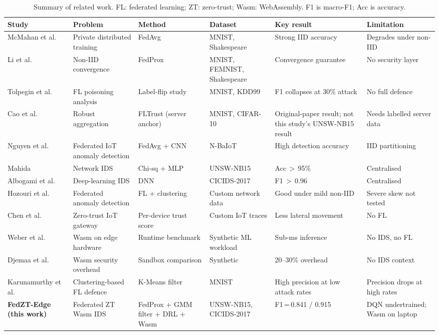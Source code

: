 \documentclass[iicol,Numbered]{sn-jnl}
\begin{document}
\begin{table}[t]
\centering
\footnotesize
\caption{Summary of related work. FL: federated learning; ZT: zero-trust;
Wasm: WebAssembly. F1 is macro-F1; Acc is accuracy.}
\label{tab:related}
\setlength{\tabcolsep}{3pt}
\begin{tabularx}{\textwidth}{@{}P{2.9cm} Y Y Y Y Y@{}}
\toprule
\textbf{Study} & \textbf{Problem} & \textbf{Method} & \textbf{Dataset} &
\textbf{Key result} & \textbf{Limitation} \\
\midrule
McMahan et al.~\cite{mcmahan2017} & Private distributed training & FedAvg & MNIST, Shakespeare & Strong IID accuracy & Degrades under non-IID \\
Li et al.~\cite{li2020federated} & Non-IID convergence & FedProx & MNIST, FEMNIST, Shakespeare & Convergence guarantee & No security layer \\
Tolpegin et al.~\cite{tolpegin2020} & FL poisoning analysis & Label-flip study & MNIST, KDD99 & F1 collapses at 30\% attack & No full defence \\
Cao et al.~\cite{cao2021fltrust} & Robust aggregation & FLTrust (server anchor) & MNIST, CIFAR-10 & Original-paper result; not this study's UNSW-NB15 result & Needs labelled server data \\
Nguyen et al.~\cite{nguyen2019} & Federated IoT anomaly detection & FedAvg + CNN & N-BaIoT & High detection accuracy & IID partitioning \\
Mahida~\cite{mahida2022} & Network IDS & Chi-sq + MLP & UNSW-NB15 & Acc\,$>$\,95\% & Centralised \\
Albogami et al.~\cite{albogami2023} & Deep-learning IDS & DNN & CICIDS-2017 & F1\,$>$\,0.96 & Centralised \\
Hozouri et al.~\cite{hozouri2023} & Federated anomaly detection & FL + clustering & Custom network data & Good under mild non-IID & Severe skew not tested \\
Chen et al.~\cite{chen2021zero} & Zero-trust IoT gateway & Per-device trust score & Custom IoT traces & Less lateral movement & No FL \\
Weber et al.~\cite{weber2024} & Wasm on edge hardware & Runtime benchmark & Synthetic ML workload & Sub-ms inference & No IDS, no FL \\
Djemaa et al.~\cite{djemaa2022} & Wasm security overhead & Sandbox comparison & Synthetic & 20--30\% overhead & No IDS context \\
Karunamurthy et al.~\cite{karunamurthy2023} & Clustering-based FL defence & K-Means filter & MNIST & High precision at low attack rates & Precision drops at high rates \\
\midrule
\textbf{FedZT-Edge (this work)} & Federated ZT Wasm IDS & FedProx + GMM filter + DRL + Wasm & UNSW-NB15, CICIDS-2017 & F1\,=\,0.841 / 0.915 & DQN undertrained; Wasm on laptop \\
\bottomrule
\end{tabularx}
\end{table}
\end{document}
